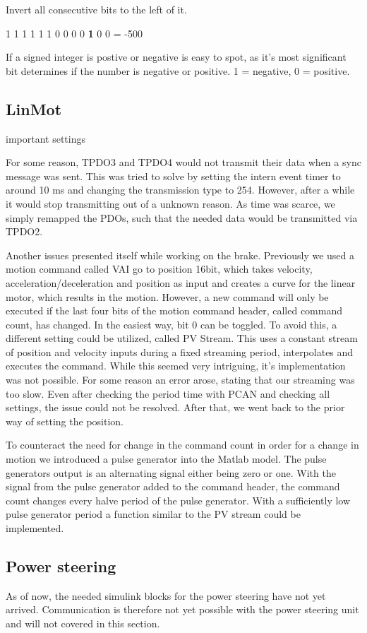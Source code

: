 Invert all consecutive bits to the left of it.

1 1 1 1  1 1 0  0 0 0  \textbf{1} 0 0 = -500

If a signed integer is postive or negative is easy to spot, as it's most significant bit determines if the number is negative or positive. 1 = negative, 0 = positive.

\subsection{LinMot}

important settings

For some reason, TPDO3 and TPDO4 would not transmit their data when a sync message was sent. This was tried to solve by setting the intern event timer to around 10 ms and changing the transmission type to 254. However, after a while it would stop transmitting out of a unknown reason. As time was scarce, we simply remapped the PDOs, such that the needed data would be transmitted via TPDO2. 


Another issues presented itself while working on the brake. Previously we used a motion command called VAI go to position 16bit, which takes velocity, acceleration/deceleration and position as input and creates a curve for the linear motor, which results in the motion. However, a new command will only be executed if the last four bits of the motion command header, called command count, has changed. In the easiest way, bit 0 can be toggled. 
To avoid this, a different setting could be utilized, called PV Stream. This uses a constant stream of position and velocity inputs during a fixed streaming period, interpolates and executes the command. While this seemed very intriguing, it's implementation was not possible. For some reason an error arose, stating that our streaming was too slow. Even after checking the period time with PCAN and checking all settings, the issue could not be resolved.
After that, we went back to the prior way of setting the position.

To counteract the need for change in the command count in order for a change in motion we introduced a pulse generator into the Matlab model.
The pulse generators output is an alternating signal either being zero or one. With the signal from the pulse generator added to the command header, the command count changes every halve period of the pulse generator. With a sufficiently low pulse generator period a function similar to the PV stream could be implemented.

\subsection{Power steering}

As of now, the needed simulink blocks for the power steering have not yet arrived. Communication is therefore not yet possible with the power steering unit and will not covered in this section.



